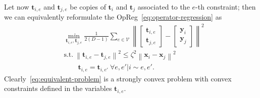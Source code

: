 \documentclass{article}
\newcommand{\norm}[1]{\left\lVert#1\right\rVert}
\newcommand{\tv}{\mathbold{t}}
\newcommand{\x}{\mathbold{x}}
\newcommand{\y}{\mathbold{y}}
\begin{document}
Let now $\tv_{i,e}$ and $\tv_{j,e}$ be copies of $\tv_i$ and $\tv_j$ associated to the $e$-th constraint; then we can equivalently reformulate the OpReg~\eqref{eq:operator-regression} as
\begin{subequations}\label{eq:equivalent-problem}
\begin{align}
	&\min_{\tv_{i,e}, \tv_{j,e}} \frac{1}{2 (D-1)} \sum_{e \in \mathcal{V}} \norm{\begin{bmatrix} \tv_{i,e} \\ \tv_{j,e} \end{bmatrix} - \begin{bmatrix} \y_i \\ \y_j \end{bmatrix}}^2 \\
	&\text{s.t.} \ \norm{\tv_{i,e} - \tv_{j,e}}^2 \leq \zeta^2 \norm{\x_i - \x_j}^2 \label{eq:interpolation-constraints} \\
	&\qquad \tv_{i,e} = \tv_{i,e'} \ \forall e, e' | i \sim e, e'. \label{eq:consensus-constraints}
\end{align}
\end{subequations}
Clearly~\eqref{eq:equivalent-problem} is a strongly convex problem with convex constraints defined in the variables $\tv_{i,e}$.

\end{document}
